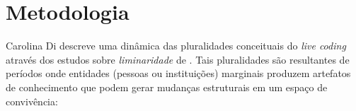 \chapter{Metodologia}\label{cap:metodologia}



Carolina Di  descreve uma dinâmica das pluralidades conceituais do \emph{live coding} através dos estudos sobre \emph{liminaridade} de . Tais pluralidades são resultantes de períodos onde entidades (pessoas ou instituições) marginais produzem artefatos de conhecimento que podem gerar mudanças estruturais em um espaço de convivência: 

